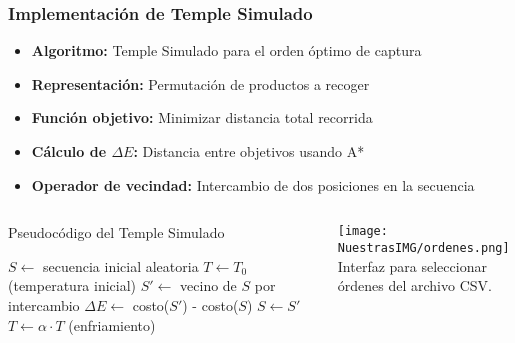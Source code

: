 \documentclass[aspectratio=169]{beamer}
\begin{document}
\begin{frame}
    \frametitle{Implementación de Temple Simulado}
    \begin{itemize}
        \item \textbf{Algoritmo:} Temple Simulado para el orden óptimo de captura
        \item \textbf{Representación:} Permutación de productos a recoger
        \item \textbf{Función objetivo:} Minimizar distancia total recorrida
        \item \textbf{Cálculo de $\Delta E$:} Distancia entre objetivos usando A*
        \item \textbf{Operador de vecindad:} Intercambio de dos posiciones en la secuencia
    \end{itemize}
    
    \begin{columns}
        \begin{block}{Pseudocódigo del Temple Simulado}
        \begin{algorithmic}[1]
        \State $S \gets$ secuencia inicial aleatoria
        \State $T \gets T_0$ (temperatura inicial)
                \State $S' \gets$ vecino de $S$ por intercambio
                \State $\Delta E \gets$ costo($S'$) - costo($S$)
                    \State $S \gets S'$
                \EndIf
            \EndFor
            \State $T \gets \alpha \cdot T$ (enfriamiento)
        \EndWhile
        \end{algorithmic}
        \end{block}
        
        \texttt{[image: NuestrasIMG/ordenes.png]}
        \vspace{0.2cm}
        \small{Interfaz para seleccionar órdenes del archivo CSV.}
    \end{columns}
\end{frame}
\end{document}
